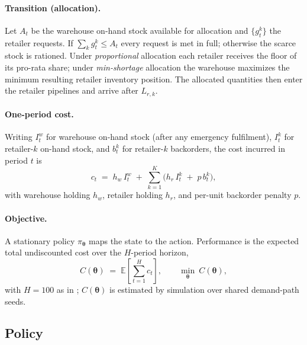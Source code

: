 \documentclass[11pt]{article}
\newcommand{\btheta}{\boldsymbol{\theta}}
\begin{document}
\paragraph{Transition (allocation).}
Let $A_t$ be the warehouse on-hand stock available for allocation and $\{g^k_t\}$ the retailer
requests. If $\sum_k g^k_t\le A_t$ every request is met in full; otherwise the scarce stock is
rationed. Under \emph{proportional} allocation each retailer receives the floor of its
pro-rata share; under \emph{min-shortage} allocation the warehouse maximizes the
minimum resulting retailer inventory position. The allocated quantities then enter the retailer
pipelines and arrive after $L_{r,k}$.

\paragraph{One-period cost.}
Writing $I^w_t$ for warehouse on-hand stock (after any emergency fulfilment), $I^k_t$ for retailer-$k$
on-hand stock, and $b^k_t$ for retailer-$k$ backorders, the cost incurred in period $t$ is
\begin{equation}
    \label{eq:owmr-cost}
    c_t \;=\; h_w\,I^w_t \;+\; \sum_{k=1}^{K}\bigl(h_r\,I^k_t \;+\; p\,b^k_t\bigr),
\end{equation}
with warehouse holding $h_w$, retailer holding $h_r$, and per-unit backorder penalty $p$.

\paragraph{Objective.}
A stationary policy $\pi_{\btheta}$ maps the state to the action. Performance is the expected total
undiscounted cost over the $H$-period horizon,
\begin{equation}
    \label{eq:owmr-objective}
    C(\btheta) \;=\; \mathbb{E}\!\left[\sum_{t=1}^{H} c_t\right],
    \qquad \min_{\btheta}\ C(\btheta),
\end{equation}
with $H=100$ as in \citet{kaynov2024owmr}; $C(\btheta)$ is estimated by simulation over shared
demand-path seeds.

\FloatBarrier

\subsection{Policy}
\label{sec:owmr-policy}
\end{document}
